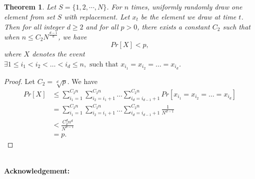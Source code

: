 \documentclass{article}
\newcommand{\Acknowledgement}[1]{\ \\{\bf Acknowledgement:} #1}
\newtheorem{theorem}{Theorem}
\begin{document}
\begin{spacing}{1.1}
    \subsection{}

    \begin{theorem}

    Let $S = \{1, 2, \cdots, N\}$. For $n$ times, uniformly randomly draw one element from set $S$ with replacement. Let $x_t$ be the element we draw at time $t$. Then for all integer $d\geq 2$ and for all $p > 0$, there exists a constant $C_2$ such that when $n \leq C_2 {N}^{\frac{d-1}{d}}$, we have
    $$Pr[X] < p,$$
    where $X$ denotes the event $\exists 1\leq i_1< i_2<\dots<i_d \leq n, \text{ such that } x_{i_1} = x_{i_2}=\dots=x_{i_d}$.

    \end{theorem}
    
    \begin{proof}
    
    Let $C_2=\sqrt[d]{p}$. We have
    \begin{align*}
    Pr[X]
    &\leq \sum_{i_1=1}^{C_2n}\sum_{i_2=i_1+1}^{C_2n}\dots\sum_{i_d=i_{d-1}+1}^{C_2n}Pr[x_{i_1} = x_{i_2}=\dots=x_{i_d}]  \\
    &=\sum_{i_1=1}^{C_2n}\sum_{i_2=i_1+1}^{C_2n}\dots\sum_{i_d=i_{d-1}+1}^{C_2n}\frac{1}{N^{d-1}}  \\
    &<\frac{C_2^dn^d}{N^{d-1}}  \\
    &=p.
    \end{align*}
    
    \end{proof}
    
    
    \Acknowledgement{}


    \end{spacing}
    
\end{document}
